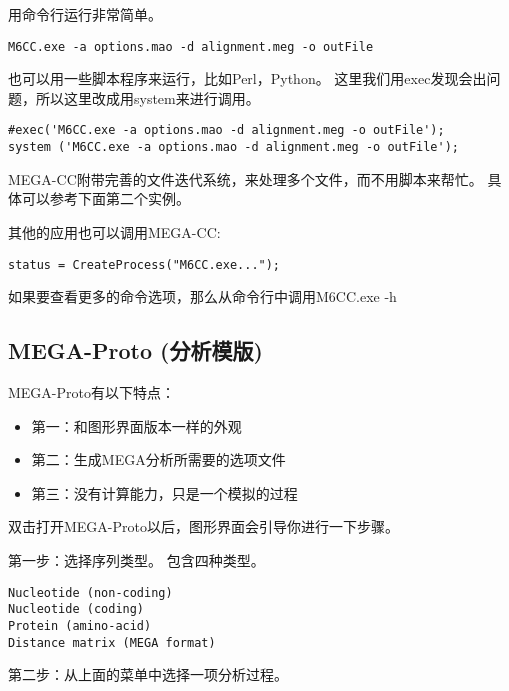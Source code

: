 \documentclass{ctexart}
\begin{document}
用命令行运行非常简单。

\begin{lstlisting}
M6CC.exe -a options.mao -d alignment.meg -o outFile
\end{lstlisting}
也可以用一些脚本程序来运行，比如Perl，Python。
这里我们用exec发现会出问题，所以这里改成用system来进行调用。

\begin{lstlisting}
#exec('M6CC.exe -a options.mao -d alignment.meg -o outFile'); 
system ('M6CC.exe -a options.mao -d alignment.meg -o outFile');
\end{lstlisting}
MEGA-CC附带完善的文件迭代系统，来处理多个文件，而不用脚本来帮忙。
具体可以参考下面第二个实例。

其他的应用也可以调用MEGA-CC:

\begin{lstlisting}
status = CreateProcess("M6CC.exe...");
\end{lstlisting}
如果要查看更多的命令选项，那么从命令行中调用M6CC.exe -h
\subsection{MEGA-Proto (分析模版)}
\label{sec-3-5}

MEGA-Proto有以下特点：
\begin{itemize}
\item 第一：和图形界面版本一样的外观
\item 第二：生成MEGA分析所需要的选项文件
\item 第三：没有计算能力，只是一个模拟的过程
\end{itemize}
双击打开MEGA-Proto以后，图形界面会引导你进行一下步骤。

第一步：选择序列类型。
包含四种类型。

\begin{lstlisting}
Nucleotide (non-coding)
Nucleotide (coding)
Protein (amino-acid)
Distance matrix (MEGA format)
\end{lstlisting}

第二步：从上面的菜单中选择一项分析过程。
\end{document}
